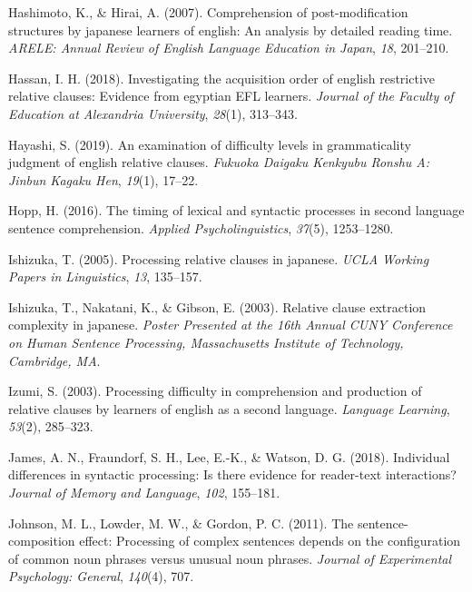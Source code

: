 \documentclass[
]{article}
\newlength{\cslhangindent}
\newenvironment{CSLReferences}[2] %
 {\begin{list}{}{%
  \setlength{\itemindent}{0pt}
  \setlength{\leftmargin}{0pt}
  \setlength{\parsep}{0pt}
  \ifodd #1
   \setlength{\leftmargin}{\cslhangindent}
   \setlength{\itemindent}{-1\cslhangindent}
  \fi
  \setlength{\itemsep}{#2\baselineskip}}}
 {\end{list}}
\begin{document}
\begin{CSLReferences}{1}{0}
Hashimoto, K., \& Hirai, A. (2007). Comprehension of post-modification
structures by japanese learners of english: An analysis by detailed
reading time. \emph{ARELE: Annual Review of English Language Education
in Japan}, \emph{18}, 201--210.

Hassan, I. H. (2018). Investigating the acquisition order of english
restrictive relative clauses: Evidence from egyptian EFL learners.
\emph{Journal of the Faculty of Education at Alexandria University},
\emph{28}(1), 313--343.

Hayashi, S. (2019). An examination of difficulty levels in
grammaticality judgment of english relative clauses. \emph{Fukuoka
Daigaku Kenkyubu Ronshu A: Jinbun Kagaku Hen}, \emph{19}(1), 17--22.

Hopp, H. (2016). The timing of lexical and syntactic processes in second
language sentence comprehension. \emph{Applied Psycholinguistics},
\emph{37}(5), 1253--1280.

Ishizuka, T. (2005). Processing relative clauses in japanese. \emph{UCLA
Working Papers in Linguistics}, \emph{13}, 135--157.

Ishizuka, T., Nakatani, K., \& Gibson, E. (2003). Relative clause
extraction complexity in japanese. \emph{Poster Presented at the 16th
Annual CUNY Conference on Human Sentence Processing, Massachusetts
Institute of Technology, Cambridge, MA}.

Izumi, S. (2003). Processing difficulty in comprehension and production
of relative clauses by learners of english as a second language.
\emph{Language Learning}, \emph{53}(2), 285--323.

James, A. N., Fraundorf, S. H., Lee, E.-K., \& Watson, D. G. (2018).
Individual differences in syntactic processing: Is there evidence for
reader-text interactions? \emph{Journal of Memory and Language},
\emph{102}, 155--181.

Johnson, M. L., Lowder, M. W., \& Gordon, P. C. (2011). The
sentence-composition effect: Processing of complex sentences depends on
the configuration of common noun phrases versus unusual noun phrases.
\emph{Journal of Experimental Psychology: General}, \emph{140}(4), 707.


\end{CSLReferences}
\end{document}
